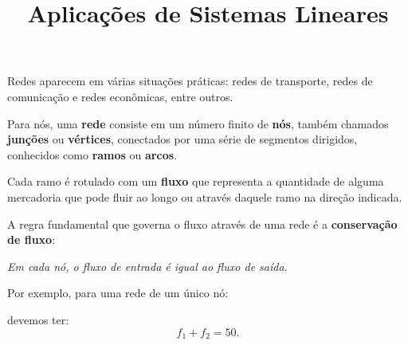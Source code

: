 \documentclass{beamer}
\title{Aplicações de Sistemas Lineares}
\author[\autor]{\autor}
\institute[\instituto]{\instituto}
\date{}
\begin{document}
    \begin{frame}
        \maketitle
    \end{frame}


    \begin{frame}

        Redes aparecem em várias situações práticas: \pause redes de transporte, \pause redes de comunicação \pause e redes econômicas, entre outros.\pause

        \vspace{1cm}

        Para nós, uma \textbf{rede} consiste em um número finito de \textbf{nós}, \pause também chamados \textbf{junções} ou \textbf{vértices}, \pause conectados por uma série de segmentos dirigidos, \pause conhecidos como \textbf{ramos} ou \textbf{arcos}.\pause

        \vspace{1cm}

        Cada ramo é rotulado com um \textbf{fluxo} \pause que representa a quantidade de alguma mercadoria \pause que pode fluir ao longo ou através daquele ramo na direção indicada.

    \end{frame}

    \begin{frame}
        A regra fundamental que governa o fluxo através de uma rede é a \textbf{conservação de fluxo}:\pause
        \begin{tcolorbox}[colback=green!30, colframe=green!80!blue, title=Conservação de fluxo]
            \textit{Em cada nó, o fluxo de entrada é igual ao fluxo de saída.}
        \end{tcolorbox}
    \end{frame}

    \begin{frame}
        Por exemplo, para uma rede de um único nó:
        \begin{figure}[!h]
            \centering
            
        \end{figure}\pause
        devemos ter:
        \[
            f_1 + f_2 = 50.
        \]
    \end{frame}
\end{document}
